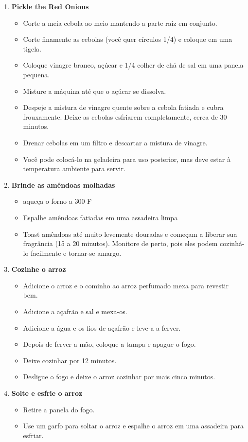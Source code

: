 \documentclass [11pt, letterpaper] {article}
\begin{document}
\begin {description}
\begin {enumerate}
\item {\bf Pickle the Red Onions}
\begin {itemize}
\item Corte a meia cebola ao meio mantendo a parte raiz em conjunto.
\item Corte finamente as cebolas (você quer círculos 1/4) e coloque em uma tigela.
\item Coloque vinagre branco, açúcar e 1/4 colher de chá de sal em uma panela pequena.
\item Misture a máquina até que o açúcar se dissolva.
\item Despeje a mistura de vinagre quente sobre a cebola fatiada e cubra frouxamente. Deixe as cebolas esfriarem completamente, cerca de 30 minutos.
\item Drenar cebolas em um filtro e descartar a mistura de vinagre.
\item Você pode colocá-lo na geladeira para uso posterior, mas deve estar à temperatura ambiente para servir.
\end {itemize}

\item {\bf Brinde as amêndoas molhadas}
\begin {itemize}
\item aqueça o forno a 300 F
\item Espalhe amêndoas fatiadas em uma assadeira limpa
\item Toast amêndoas até muito levemente douradas e começam a liberar sua fragrância (15 a 20 minutos). Monitore de perto, pois eles podem cozinhá-lo facilmente e tornar-se amargo.
\end {itemize}


\item {\bf Cozinhe o arroz}
\begin {itemize}
\item Adicione o arroz e o cominho ao arroz perfumado mexa para revestir bem.
\item Adicione a açafrão e sal e mexa-os.
\item Adicione a água e os fios de açafrão e leve-a a ferver.
\item Depois de ferver a mão, coloque a tampa e apague o fogo.
\item Deixe cozinhar por 12 minutos.
\item Desligue o fogo e deixe o arroz cozinhar por mais cinco minutos.
\end {itemize}

\item {\bf Solte e esfrie o arroz}
\begin {itemize}
\item Retire a panela do fogo.
\item Use um garfo para soltar o arroz e espalhe o arroz em uma assadeira para esfriar.
\end {itemize}


\end{enumerate}
\end{description}
\end{document}
